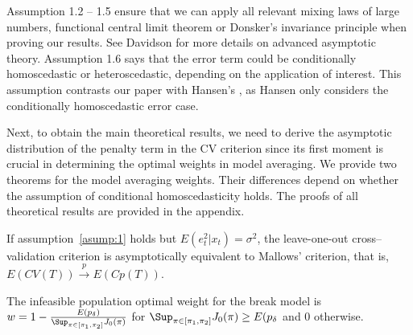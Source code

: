 Assumption 1.2 -- 1.5 ensure that we can apply all relevant mixing laws of large numbers, functional central limit theorem or Donsker's invariance principle when proving our results. See Davidson \cite{davidson_textbook} for more details on advanced asymptotic theory. Assumption 1.6 says that the error term could be conditionally homoscedastic or heteroscedastic, depending on the application of interest. This assumption contrasts our paper with Hansen's \cite{hansen2009averaging}, as Hansen only considers the conditionally homoscedastic error case.

Next, to obtain the main theoretical results, we need to derive the asymptotic distribution of the penalty term in the CV criterion since its first moment is crucial in determining the optimal weights in model averaging. We provide two theorems for the model averaging weights. Their differences depend on whether the assumption of conditional homoscedasticity holds. The proofs of all theoretical results are provided in the appendix.
\begin{proposition} \label{thm:1}
If assumption~\ref{asump:1} holds but $E(e_t^{2}|x_t) = \sigma^{2}$, the leave-one-out cross--validation criterion is asymptotically equivalent to Mallows' criterion, that is, $E(CV(T)) \stackrel{p}{\rightarrow} E(Cp(T))$.
\end{proposition}
\begin{corollary} \label{corollary:1}
The infeasible population optimal weight for the break model is $w = 1 - \frac{E(p_{\delta})}{\Sup_{\pi \in [\pi_{1}, \pi_{2}]}J_{0}(\pi)}$ for $\Sup_{\pi \in [\pi_{1}, \pi_{2}]}J_{0}(\pi) \geq E(p_{\delta}$ and $0$ otherwise. 
\end{corollary}
